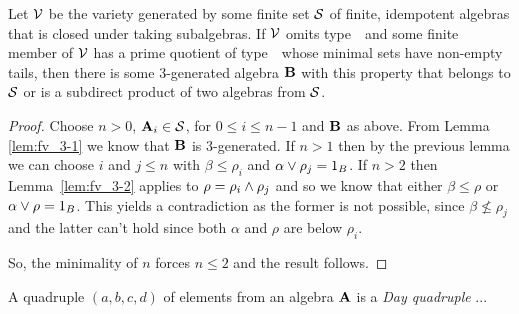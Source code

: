 

\begin{theorem}\label{thm:fv_3-4}
Let $\mathcal{V}$ be the variety generated by some finite set $\mathcal{S}$ of finite,
idempotent algebras that is closed under taking subalgebras. If\/ $\mathcal{V}$
omits type~\utyp\ and some finite member of $\mathcal{V}$ has a prime quotient 
of type~\atyp\
whose minimal sets have non-empty tails, then there is some
3-generated algebra $\mathbf{B}$ with this property that belongs to $\mathcal{S}$ or is a subdirect
product of two algebras from $\mathcal{S}$. 
\end{theorem}
\begin{proof}
Choose $n > 0$, $\mathbf{A}_i \in \mathcal{S}$, for $0 \le i \le n-1$ and $\mathbf{B}$
as above. From Lemma \ref{lem:fv_3-1} we know that $\mathbf{B}$ is
3-generated. If $n > 1$ then by the previous lemma we can choose $i$
and $j \le n$ with $\beta \le \rho_i$ and $\alpha \join \rho_j =
1_B$. If $n > 2$ then Lemma~\ref{lem:fv_3-2} applies to $\rho = \rho_i
\meet \rho_j$ and so we know that either $\beta \le \rho$ or $\alpha
\join \rho = 1_B$. This yields a contradiction as the former is not
possible, since $\beta \not\le \rho_j$ and the latter can't hold
since both $\alpha$ and $\rho$ are below $\rho_i$.

So, the minimality of $n$ forces $n\le 2$ and the result follows.
\end{proof}

A quadruple $(a,b,c,d)$ of elements from an algebra $\mathbf{A}$
is a \emph{Day quadruple} ...


